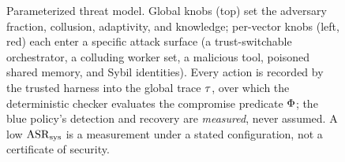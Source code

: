 \begin{figure}[t]
{}
\caption{Parameterized threat model. Global knobs (top) set the adversary fraction, collusion,
adaptivity, and knowledge; per-vector knobs (left, red) each enter a specific attack surface
(a trust-switchable orchestrator, a colluding worker set, a malicious tool, poisoned shared
memory, and Sybil identities). Every action is recorded by the trusted harness into the global
trace $\tau$, over which the deterministic checker evaluates the compromise predicate
$\Phi$; the blue policy's detection and recovery are \emph{measured}, never assumed. A low
$\mathrm{ASR}_{\mathrm{sys}}$ is a measurement under a stated configuration, not a certificate of security.}
\label{fig:threat}
\end{figure}
